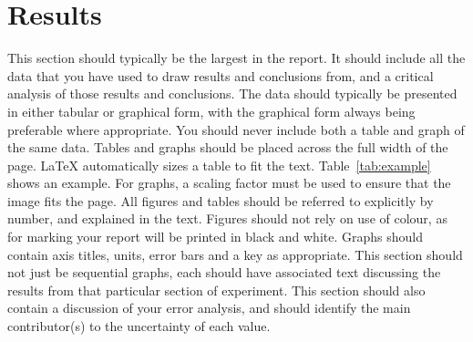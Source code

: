 \documentclass[11pt]{article} %
\begin{document}
\section{Results}

This section should typically be the largest in the report. It should include all the data that you have used to draw results and conclusions from, and a critical analysis of those results and conclusions. The data should typically be presented in either tabular or graphical form, with the graphical form always being preferable where appropriate. You should never include both a table and graph of the same data. Tables and graphs should be placed across the full width of the page. LaTeX automatically sizes a table to fit the text.  Table~\ref{tab:example} shows an example. 
For graphs, a scaling factor must be used to ensure that the image fits the page. All figures and tables should be referred to explicitly by number, and explained in the text. Figures should not rely on use of colour, as for marking your report will be printed in black and white. Graphs should contain axis titles, units, error bars and a key as appropriate. This section should not just be sequential graphs, each should have associated text discussing the results from that particular section of experiment. This section should also contain a discussion of your error analysis, and should identify the main contributor(s) to the uncertainty of each value.
\end{document}
